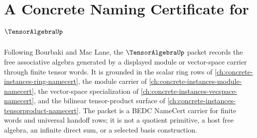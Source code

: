 \chapter{A Concrete Naming Certificate for $\TensorAlgebraUp$}
\label{ch:concrete-instances-tensor-algebra-namecert}

Following Bourbaki and Mac Lane, the $\TensorAlgebraUp$ packet records the free associative algebra generated by a displayed module or vector-space carrier through finite tensor words. It is grounded in the scalar ring rows of \autoref{ch:concrete-instances-ring-namecert}, the module carrier of \autoref{ch:concrete-instances-module-namecert}, the vector-space specialization of \autoref{ch:concrete-instances-vecspace-namecert}, and the bilinear tensor-product surface of \autoref{ch:concrete-instances-tensorproduct-namecert}. The packet is a BEDC NameCert carrier for finite words and universal handoff rows; it is not a quotient primitive, a host free algebra, an infinite direct sum, or a selected basis construction.


